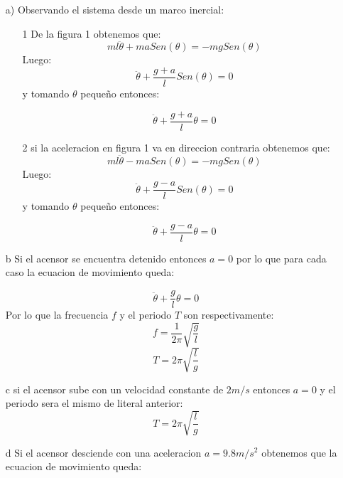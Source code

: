 \documentclass[a4paper]{article}
\begin{document}
     \begin{answer}[Problema 3.]
     
\begin{enumerate}
\item[a)] Observando el sistema desde un marco inercial:
\begin{enumerate}
    
    \item[1] De la figura 1 obtenemos que:
        \begin{equation*}
            ml\ddot{\theta} + maSen(\theta) = -mgSen(\theta) 
        \end{equation*}
        Luego:
        \begin{equation*}
             \ddot{\theta} + \frac{g+a}{l}Sen(\theta) = 0
        \end{equation*}
        y tomando $\theta$ pequeño  entonces:
        
            \begin{equation*}
             \ddot{\theta} + \frac{g+a}{l}\theta = 0
        \end{equation*}
        \item[2]  si la aceleracion en figura 1 va en direccion contraria obtenemos que:
        \begin{equation*}
            ml\ddot{\theta}- maSen(\theta) = -mgSen(\theta) 
        \end{equation*}
        Luego:
        \begin{equation*}
             \ddot{\theta} + \frac{g-a}{l}Sen(\theta) = 0
        \end{equation*}
        y tomando $\theta$ pequeño  entonces:
        
            \begin{equation*}
             \ddot{\theta} + \frac{g-a}{l}\theta = 0
        \end{equation*}
\end{enumerate}
\item[b] Si el acensor se encuentra detenido entonces $a=0$ por lo que para cada caso la ecuacion de movimiento queda:

    \begin{equation*}
             \ddot{\theta} + \frac{g}{l}\theta = 0
        \end{equation*}
    Por lo que la frecuencia $f$ y el periodo $T$ son respectivamente:
    $$f = \frac{1}{2\pi} \sqrt{\frac{g}{l}}$$
    $$T = 2\pi \sqrt{\frac{l}{g}}$$
    \item[c] si el acensor sube con un velocidad constante de $2m/s$ entonces $a = 0$ y el periodo sera el mismo de literal anterior:
    $$T = 2\pi\sqrt{\frac{l}{g}}$$
    \item[d] Si el acensor desciende con una aceleracion $a = 9.8m/s^2$ obtenemos que la ecuacion de movimiento queda:


\end{enumerate}
\end{answer}
\end{document}
